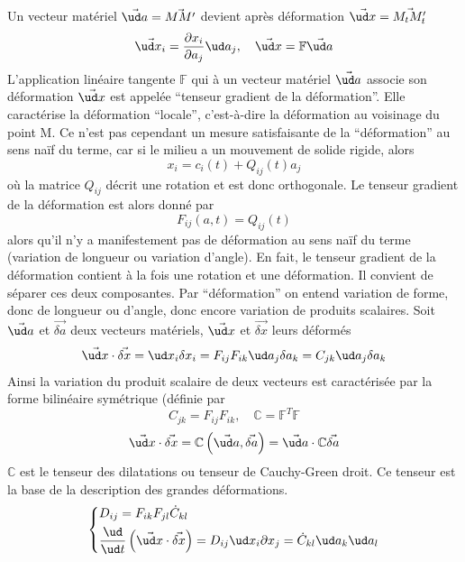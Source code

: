 Un vecteur matériel $\vec{\ud a} = \vec{MM'}$ devient après déformation $\vec{\ud x} = \vec{M_t M_t'}$
\begin{equation}
    \vec{\ud x_i} = \frac{\partial x_i}{\partial a_j} \ud a_j, \quad \vec{\ud x} = \mathbb{F} \vec{\ud a}
    \label{eq:Ch03-002}
\end{equation}
L'application linéaire tangente $\mathbb{F}$ qui à un vecteur matériel $\vec{\ud a}$ associe son déformation $\vec{\ud x}$ est appelée ``tenseur gradient de la déformation''.
Elle  caractérise la déformation ``locale'',  c'est-à-dire la déformation au  voisinage du point M.
Ce n'est pas cependant un mesure satisfaisante de la ``déformation'' au sens naïf du terme, car si le milieu a un mouvement de solide rigide, alors
\begin{equation}
    x_i = c_i (t) + Q_{ij} (t) a_j
    \label{eq:Ch03-003}
\end{equation}
où la matrice $Q_{ij}$ décrit une rotation et est donc orthogonale.
Le tenseur gradient de la déformation est alors donné par
\begin{equation}
    F_{ij} (a,t) = Q_{ij} (t)
    \label{eq:Ch03-004}
\end{equation}
alors qu'il n'y a manifestement pas de déformation au sens naïf du terme (variation de longueur ou variation d'angle).
En fait, le tenseur gradient de la déformation contient à la fois une rotation et une déformation.
Il convient de séparer ces deux composantes.
Par ``déformation'' on entend variation de forme, donc de longueur ou d'angle, donc encore variation de produits scalaires.
Soit $\vec{\ud a}$ et $\vec{\delta a}$ deux vecteurs matériels, $\vec{\ud x}$ et $\vec{\delta x}$ leurs déformés
\begin{equation}
    \vec{\ud x} \cdot \vec{\delta x} = \ud x_i \delta x_i = F_{ij} F_{ik} \ud a_j \delta a_k = C_{jk} \ud a_j \delta a_k
    \label{eq:Ch03-005}
\end{equation}
Ainsi la variation du produit scalaire de deux vecteurs est caractérisée par la forme bilinéaire symétrique (définie par
\begin{equation}
    C_{jk} = F_{ij} F_{ik}, \quad \mathbb{C} = \mathbb{F}^T \mathbb{F}
    \label{eq:Ch03-006}
\end{equation}
\begin{equation}
    \vec{\ud x} \cdot \vec{\delta x} = \mathbb{C} \left( \vec{\ud a}, \vec{\delta a} \right) = \vec{\ud a} \cdot \mathbb{C} \vec{\delta a}
    \label{eq:Ch03-007}
\end{equation}
$\mathbb{C}$ est le tenseur des dilatations ou tenseur de Cauchy-Green droit.
Ce tenseur est la base de la description des grandes déformations.
\begin{equation}
    \left\{
    \begin{aligned}
        & D_{ij} = F_{ik} F_{jl} \dot{C}_{kl} \\
        & \frac{\ud}{\ud t} \left( \vec{\ud x} \cdot \vec{\delta x} \right) = D_{ij} \ud x_i \partial x_j = \dot{C}_{kl} \ud a_k \ud a_l
    \end{aligned}
    \right.
    \label{eq:Ch03-008}
\end{equation}
